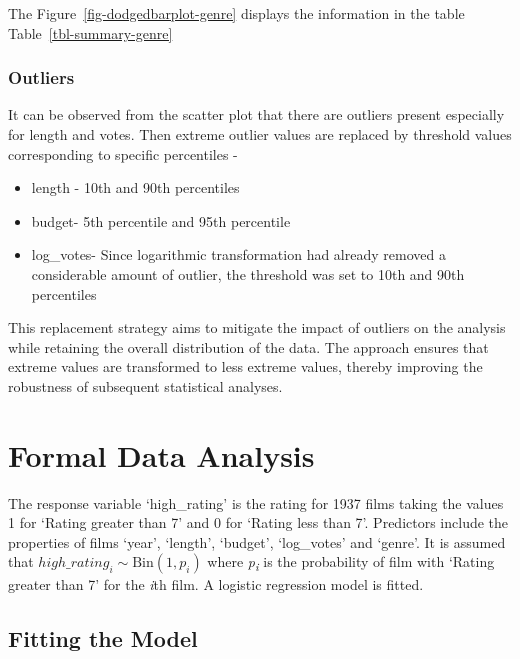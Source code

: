 \documentclass[
  letterpaper,
  DIV=11,
  numbers=noendperiod]{scrartcl}
\begin{document}
The Figure~\ref{fig-dodgedbarplot-genre} displays the information in the
table Table~\ref{tbl-summary-genre}

\clearpage

\hypertarget{outliers}{%
\subsubsection{Outliers}\label{outliers}}

It can be observed from the scatter plot that there are outliers present
especially for length and votes. Then extreme outlier values are
replaced by threshold values corresponding to specific percentiles -

\begin{itemize}
\item
  length - 10th and 90th percentiles
\item
  budget- 5th percentile and 95th percentile
\item
  log\_votes- Since logarithmic transformation had already removed a
  considerable amount of outlier, the threshold was set to 10th and 90th
  percentiles
\end{itemize}

This replacement strategy aims to mitigate the impact of outliers on the
analysis while retaining the overall distribution of the data. The
approach ensures that extreme values are transformed to less extreme
values, thereby improving the robustness of subsequent statistical
analyses.

\hypertarget{sec-Formal}{%
\section{Formal Data Analysis}\label{sec-Formal}}

The response variable `high\_rating' is the rating for 1937 films taking
the values 1 for `Rating greater than 7' and 0 for `Rating less than 7'.
Predictors include the properties of films `year', `length', `budget',
`log\_votes' and `genre'. It is assumed that
\(high\_rating_i \sim \text{Bin}(1, p_i)\) where
\emph{p\textsubscript{i}} is the probability of film with `Rating
greater than 7' for the \emph{i}th film. A logistic regression model is
fitted.

\hypertarget{sec-fm}{%
\subsection{Fitting the Model}\label{sec-fm}}
\end{document}
